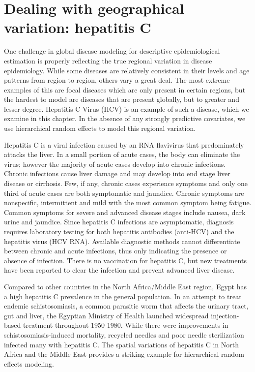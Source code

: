 \chapter{Dealing with geographical variation: hepatitis C}
\label{applications-rfx}

One challenge in global disease modeling for descriptive
epidemiological estimation is properly reflecting the true regional
variation in disease epidemiology. While some diseases are relatively
consistent in their levels and age patterns from region to region,
others vary a great deal.  The most extreme examples of this are focal
diseases which are only present in certain regions, but the hardest to
model are diseases that are present globally, but to greater and lesser
degree.  Hepatitis C Virus (HCV) is an example of such a disease,
which we examine in this chapter.  In the absence of any strongly
predictive covariates, we use hierarchical random effects to model
this regional variation.

Hepatitis C is a viral infection caused by an RNA flavivirus that
predominately attacks the liver.  In a small
portion of acute cases, the body can eliminate the virus; however the
majority of acute cases develop into chronic infections.  Chronic
infections cause liver damage and may develop into end stage liver
disease or cirrhosis.  Few, if any, chronic cases experience symptoms
and only one third of acute cases are both symptomatic and jaundice.
Chronic symptoms are nonspecific, intermittent and mild with the most
common symptom being fatigue.  Common symptoms for severe and advanced
disease stages include nausea, dark urine and jaundice.  Since
hepatitis C infections are asymptomatic, diagnosis requires laboratory
testing for both hepatitis antibodies (anti-HCV) and the hepatitis
virus (HCV RNA).  Available diagnostic methods cannot differentiate
between chronic and acute infections, thus only indicating the presence
or absence of infection.  There is no vaccination for hepatitis C, but
new treatments have been reported to clear the infection and
prevent advanced liver disease. \cite{hoofnagle_hepatitis_1997,
  ghany_diagnosis_2009, ghany_update_2011}

Compared to other countries in the North Africa/Middle East region,
Egypt has a high hepatitis C prevalence in the general population.  In an attempt to treat
endemic schistosomiasis, a common parasitic worm that affects the
urinary tract, gut and liver, the Egyptian Ministry of Health launched
widespread injection-based treatment throughout 1950-1980.  While
there were improvements in schistosomiasis-induced mortality, recycled
needles and poor needle sterilization infected many with hepatitis
C. \cite{frank_role_2000, mezban_hepatitis_2006,
  strickland_liver_2006} The spatial variations of hepatitis C in
North Africa and the Middle East provides a striking example for
hierarchical random effects modeling.

